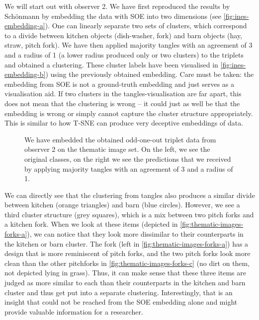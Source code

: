 We will start out with observer 2. We have first reproduced the results by Schönmann by embedding the data with SOE into two dimensions 
(see \autoref{fig:ines-embedding-a}). One can linearly separate two sets of clusters, which correspond to a divide between kitchen objects 
(dish-washer, fork) and barn objects (hay, straw, pitch fork).  We have then applied majority tangles with an agreement of 3 and a radius of 1 (a lower radius produced only or two clusters) to the triplets and obtained a clustering. These cluster labels 
have been visualised in \autoref{fig:ines-embedding-b}) using the previously obtained embedding. Care must be taken: the embedding
from SOE is not a ground-truth embedding and just serves as a visualisation aid. If two clusters in the tangles-visualisation are far 
apart, this does not mean that the clustering is wrong – it could just as well be that the embedding is wrong or simply cannot capture
the cluster structure appropriately. This is similar to how T-SNE can produce very deceptive embeddings of data.

\onecolumn
\begin{figure}[ht]
    \centering
    \caption{
        We have embedded the obtained odd-one-out triplet data from observer 2 on the thematic image set.
        On the left, we see the original classes, on the right we see the predictions that we received by
        applying majority tangles with an agreement of 3 and a radius of 1.
    }
    \label{fig:ines-embedding}
\end{figure}


We can directly see that the clustering from tangles also produces a similar divide between kitchen (orange triangles) and barn (blue circles). 
However, we see a third cluster structure (grey squares), which is a mix between two pitch forks and a kitchen fork. 
When we look at these items (depicted in \autoref{fig:thematic-images-forks-a}), we can notice that they look more dissimilar to their
counterparts in the kitchen or barn cluster. The fork (left in \autoref{fig:thematic-images-forks-a}) has a design that is more reminiscent of pitch forks, and the two pitch forks
look more clean than the other pitchforks in \autoref{fig:thematic-images-forks-c} (no dirt on them, not depicted lying in grass). Thus, it can make sense that these three items are judged
as more similar to each than their counterparts in the kitchen and barn cluster and thus get put into a separate clustering. Interestingly, that is an insight that could not be reached from the 
SOE embedding alone and might provide valuable information for a researcher.

